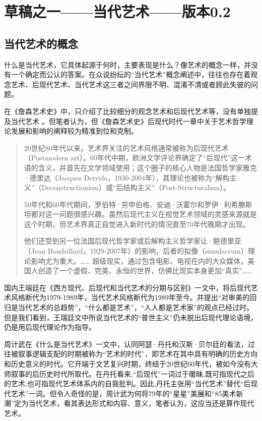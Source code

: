 \chapter{草稿之一——当代艺术——版本0.2}

\section{当代艺术的概念}

什么是当代艺术，它具体起源于何时，主要表现是什么？像艺术的概念一样，并没有一个确定而公认的答案。在众说纷纭的“当代艺术”概念阐述中，往往也存在着观念艺术、后现代艺术、当代艺术这三者之间界限不明、混淆不清或者顾此失彼的问题。

在《詹森艺术史》中，只介绍了比较细分的观念艺术和后现代艺术等，没有单独提及当代艺术 。但笔者认为，但《詹森艺术史》后现代时代一章中关于艺术哲学理论发展和影响的阐释较为精准到位和克制。

\begin{quotation} 20世纪80年代以来，艺术界关注的艺术风格通常被称为后现代艺术（Postmodern art）。60年代中期，欧洲文学评论界确定了“后现代”这一术语的含义，并首先在文学领域使用；这个圈子的核心人物是法国哲学家雅克·德里达（Jacques Derrida，1930-2004年），其理论也被称为“解构主义”（Deconstructionism）或“后结构主义”（Post-Structuralism）。\medskip

  50年代和60年代期间，罗伯特·劳申伯格、安迪·沃霍尔和罗伊·利希滕斯坦都对这一问题很感兴趣。虽然后现代主义在视觉艺术领域的灵感来源就是这个时期，但艺术界真正自觉进入新时代的情况直至70年代晚期才出现。\medskip

  他们还受到另一位法国后现代哲学家或后解构主义哲学家让·鲍德里亚（Jean Baudrillard，1929-2007年）的影响，后者的拟像（simulacrum）理论影响尤为重大。…… 超级现实，通过包含电影、电视在内的大众媒体，美国人创造了一个虚假、完美、永恒的世界，仿佛比现实本身更加“真实”……
\end{quotation}

国内王端廷在《西方现代、后现代和当代艺术的分期与区别》一文中，将后现代艺术风格断代为1979-1989年，当代艺术风格断代为1989年至今。并提出“对审美的回归是当代艺术的总趋势”，“什么都是艺术”，“人人都是艺术家”的观点已经过时。但是我们看到，王瑞廷文中所说当代艺术的“普世主义”仍未脱出后现代理论语境，仍是用后现代理论作为指导。\cite{wangduanting}

周计武在《什么是当代艺术》一文中，认同阿瑟·丹托和汉斯·贝尔廷的看法，过往被叙事逻辑支配的时期被称为“艺术的时代”，即艺术在其中具有明确的历史方向和历史意义的时代。它开端于文艺复兴时期，终结于20世纪60年代，被如今没有大师叙事的后历史时代所取代。在丹托看来,“后现代”一词过于暖昧,既可指现代之后的艺术,也可指现代艺术体系内的自我批判。因此,丹托主张用“当代艺术”替代“后现代艺术”一词。\cite{whatsart}但令人奇怪的是，周计武为何将79年的“星星”美展和“85美术新潮”定为当代艺术，看其表达形式和内容、意义，笔者认为，这应当还是算作现代艺术。

